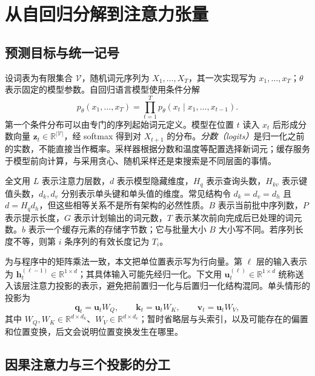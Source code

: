 \documentclass[UTF8,12pt,a4paper,fontset=fandol]{ctexart}
\begin{document}
\section{从自回归分解到注意力张量}
\label{sec:kv-attention}

\subsection{预测目标与统一记号}

设词表为有限集合 $\mathcal V$，随机词元序列为 $X_1,\ldots,X_T$，其一次实现写为 $x_1,\ldots,x_T$；$\theta$ 表示固定的模型参数。自回归语言模型使用条件分解
\begin{equation}
 p_\theta(x_1,\ldots,x_T)
 =\prod_{t=1}^{T}p_\theta(x_t\mid x_1,\ldots,x_{t-1}).
 \label{eq:kv-autoregressive}
\end{equation}
第一个条件分布可以由专门的序列起始词元定义。模型在位置 $t$ 读入 $x_t$ 后形成分数向量 $\mathbf z_t\in\mathbb R^{|\mathcal V|}$，经 softmax 得到对 $X_{t+1}$ 的分布。\emph{分数（logits）}是归一化之前的实数，不能直接当作概率。采样器根据分数和温度等配置选择新词元；缓存服务于模型前向计算，与采用贪心、随机采样还是束搜索是不同层面的事情。

全文用 $L$ 表示注意力层数，$d$ 表示模型隐藏维度，$H_q$ 表示查询头数，$H_{kv}$ 表示键值头数，$d_k,d_v$ 分别表示单头键和单头值的维度。常见结构令 $d_k=d_v=d_h$ 且 $d=H_qd_h$，但这些相等关系不是所有架构的必然性质。$B$ 表示当前批中序列数，$P$ 表示提示长度，$G$ 表示计划输出的词元数，$T$ 表示某次前向完成后已处理的词元数。$b$ 表示一个缓存元素的存储字节数；它与批量大小 $B$ 大小写不同。若序列长度不等，则第 $i$ 条序列的有效长度记为 $T_i$。

为与程序中的矩阵乘法一致，本文把单位置表示写为行向量。第 $\ell$ 层的输入表示为 $\mathbf h_t^{(\ell-1)}\in\mathbb R^{1\times d}$；其具体输入可能先经归一化。下文用 $\mathbf u_t^{(\ell)}\in\mathbb R^{1\times d}$ 统称送入该层注意力投影的表示，避免把前置归一化与后置归一化结构混同。单头情形的投影为
\begin{equation}
 \mathbf q_t=\mathbf u_tW_Q,\qquad
 \mathbf k_t=\mathbf u_tW_K,\qquad
 \mathbf v_t=\mathbf u_tW_V,
 \label{eq:kv-projection}
\end{equation}
其中 $W_Q,W_K\in\mathbb R^{d\times d_k}$、$W_V\in\mathbb R^{d\times d_v}$；暂时省略层与头索引，以及可能存在的偏置和位置变换，后文会说明位置变换发生在哪里。

\subsection{因果注意力与三个投影的分工}
\end{document}
